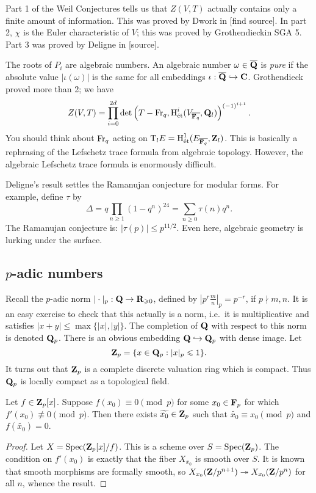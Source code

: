 Part 1 of the Weil Conjectures tells us that $Z(V,T)$ actually contains only a 
finite amount of information. This was proved by Dwork in [find source]. In 
part 2, $\chi$ is the Euler characteristic of $V$; this was proved by 
Grothendieckin SGA 5. Part 3 was proved by Deligne in [source]. 

The roots of $P_i$ are algebraic numbers. An algebraic number 
$\omega\in \overline{\mathbf{Q}}$ is \emph{pure} if the absolute value 
$|\iota(\omega)|$ is the same for all embeddings 
$\iota:\overline{\mathbf{Q}}\hookrightarrow \mathbf{C}$. Grothendieck proved more than 2; we have 
\[
  Z(V,T) = \prod_{i=0}^{2 d} \det\left(T-\operatorname{Fr}_q,\operatorname{H}_{\textnormal{\'et}}^i(V_{\overline{\mathbf{F}_q}},\mathbf{Q}_l)\right)^{(-1)^{i+1}} .
\]
You should think about $\operatorname{Fr}_q$ acting on 
$\mathrm{T}_l E = \operatorname{H}_{\textnormal{\'et}}^1(E_{\overline{\mathbf{F}_q}},\mathbf{Z}_l)$. This is basically 
a rephrasing of the Lefschetz trace formula from algebraic topology. However, 
the algebraic Lefschetz trace formula is enormously difficult. 

Deligne's result settles the Ramanujan conjecture for modular forms. For 
example, define $\tau$ by 
\[
  \Delta=q \prod_{n\geqslant 1} (1-q^n)^{24} = \sum_{n\geqslant 0} \tau(n) q^n .
\]
The Ramanujan conjecture is: $|\tau(p)|\leqslant p^{11/2}$. Even here, 
algebraic geometry is lurking under the surface. 





\subsection{\texorpdfstring{$p$}{p}-adic numbers}

Recall the $p$-adic norm $|\cdot|_p:\mathbf{Q}\to \mathbf{R}_{\geqslant 0}$, 
defined by $|p^r \frac m n |_p = p^{-r}$, if $p\nmid m,n$. It is an easy 
exercise to check that this actually is a norm, i.e.~it is multiplicative and 
satisfies $|x+y|\leqslant \max\{|x|,|y|\}$. The completion of $\mathbf{Q}$ with 
respect to this norm is denoted $\mathbf{Q}_p$. There is an obvious embedding 
$\mathbf{Q}\hookrightarrow \mathbf{Q}_p$ with dense image. Let 
\[
  \mathbf{Z}_p=\{x\in \mathbf{Q}_p:|x|_p\leqslant 1\} .
\]
It turns out that $\mathbf{Z}_p$ is a complete discrete valuation ring which is 
compact. Thus $\mathbf{Q}_p$ is locally compact as a topological field. 

\begin{lemma}[Hensel]\label{lem:hensel}
Let $f\in \mathbf{Z}_p[x]$. Suppose $f(x_0)\equiv 0\pmod p$ for some 
$x_0\in \mathbf{F}_p$ for which $f'(x_0)\not\equiv 0\pmod p$. Then there exists 
$\widetilde{x_0}\in \mathbf{Z}_p$ such that $\widetilde{x_0}\equiv x_0\pmod p$ and 
$f(\widetilde{x_0})=0$. 
\end{lemma}
\begin{proof}
Let $X=\operatorname{Spec}(\mathbf{Z}_p[x]/f)$. This is a scheme over $S=\operatorname{Spec}(\mathbf{Z}_p)$. 
The condition on $f'(x_0)$ is exactly that the fiber $X_{x_0}$ is smooth 
over $S$. It is known that smooth morphisms are formally smooth, so 
$X_{x_0}(\mathbf{Z}/p^{n+1}) \twoheadrightarrow X_{x_0}(\mathbf{Z}/p^n)$ for all $n$, whence the 
result. 
\end{proof}

